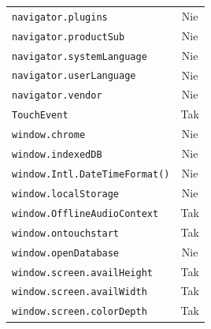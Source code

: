\begin{table}
\begin{tabular}{|l|c|}
		\texttt{navigator.plugins}                  & Nie                                    \\
		\texttt{navigator.productSub}               & Nie                                    \\
		\texttt{navigator.systemLanguage}           & Nie                                    \\
		\texttt{navigator.userLanguage}             & Nie                                    \\
		\texttt{navigator.vendor}                   & Nie                                    \\
		\texttt{TouchEvent}                         & Tak                                    \\
		\texttt{window.chrome}                      & Nie                                    \\
		\texttt{window.indexedDB}                   & Nie                                    \\
		\texttt{window.Intl.DateTimeFormat()}       & Nie                                    \\
		\texttt{window.localStorage}                & Nie                                    \\
		\texttt{window.OfflineAudioContext}         & Tak                                    \\
		\texttt{window.ontouchstart}                & Tak                                    \\
		\texttt{window.openDatabase}                & Nie                                    \\
		\texttt{window.screen.availHeight}          & Tak                                    \\
		\texttt{window.screen.availWidth}           & Tak                                    \\
		\texttt{window.screen.colorDepth}           & Tak                                    \\
		\hline
	\end{tabular}
\end{table}

